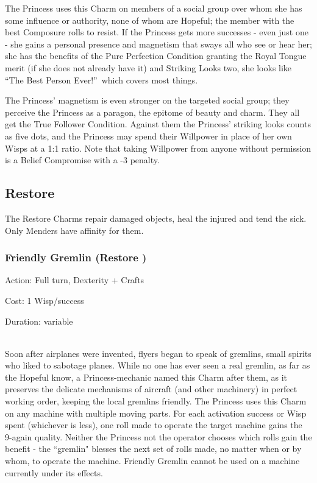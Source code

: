 The Princess uses this Charm on members of a social group over whom she has some influence or authority, none of whom are Hopeful; the member with the best Composure rolls to resist. If the Princess gets more successes - even just one - she gains a personal presence and magnetism that sways all who see or hear her; she has the benefits of the Pure Perfection Condition granting the Royal Tongue merit (if she does not already have it) and Striking Looks two, she looks like \textquotedblleft The Best Person Ever!\textquotedblright\, which covers most things. 

The Princess' magnetism is even stronger on the targeted social group; they perceive the Princess as a paragon, the epitome of beauty and charm. They all get the True Follower Condition. Against them the Princess' striking looks counts as five dots, and the Princess may spend their Willpower in place of her own Wisps at a 1:1 ratio. Note that taking Willpower from anyone without permission is a Belief Compromise with a -3 penalty.

\subsection*{Restore}
The Restore Charms repair damaged objects, heal the injured and tend the sick. Only Menders have affinity for them.
\subsubsection*{Friendly Gremlin (Restore \textbullet)}

\noindent Action: Full turn, Dexterity + Crafts

\noindent Cost: 1 Wisp/success

\noindent Duration: variable \\\

\noindent Soon after airplanes were invented, flyers began to speak of gremlins, small spirits who liked to sabotage planes. While no one has ever seen a real gremlin, as far as the Hopeful know, a Princess-mechanic named this Charm after them, as it preserves the delicate mechanisms of aircraft (and other machinery) in perfect working order, keeping the local gremlins friendly. The Princess uses this Charm on any machine with multiple moving parts. For each activation success or Wisp spent (whichever is less), one roll made to operate the target machine gains the 9-again quality. Neither the Princess not the operator chooses which rolls gain the benefit - the \textquotedblleft gremlin" blesses the next set of rolls made, no matter when or by whom, to operate the machine. Friendly Gremlin cannot be used on a machine currently under its effects.

